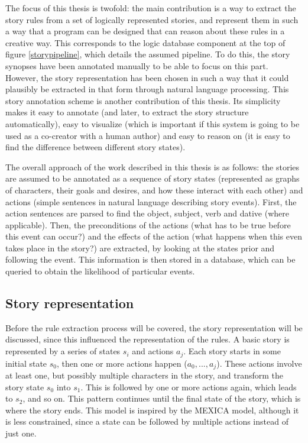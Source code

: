 The focus of this thesis is twofold: the main contribution is a way to extract
the story rules from a set of logically represented stories, and represent them 
in such a way that a program can be designed that can reason about these rules in a creative way. 
This corresponds to the logic database component at the top
of figure \ref{storypipeline}, which details the assumed pipeline. To do this, the story synopses have been
annotated manually to be able to focus on this part. However, the story
representation has been chosen in such a way that it could plausibly be extracted
in that form through natural language processing. 
This story annotation scheme is another contribution of this thesis. Its
simplicity makes it easy to annotate (and later, to extract the story structure automatically),
easy to visualize (which is important if this system is going to be used as a
co-creator with a human author) and easy to reason on (it is easy to find the
difference between different story states).

The overall approach of the work described in this thesis is as follows: the
stories are assumed to be annotated as a sequence of story states (represented
as graphs of characters, their goals and desires, and how these interact with
each other) and actions (simple sentences in natural language describing story
events). First, the action sentences are parsed to find the object, subject,
verb and dative (where applicable). Then, the preconditions of the actions (what
has to be true before this event can occur?) and the effects of the action (what
happens when this even takes place in the story?) are extracted, by looking at
the states prior and following the event. This information is then stored in a
database, which can be queried to obtain the likelihood of particular events.

\subsection{Story representation}

Before the rule extraction process will be covered, the story representation
will be discussed, since this influenced the representation of the rules.
A basic story is represented by a series of states $s_i$ and actions $a_j$.
Each story starts in some initial state $s_0$, then one or more actions happen
($a_0, ..., a_j$). These actions involve at least one, but
possibly multiple characters in the story, and transform the story state $s_0$
into $s_1$. This is followed by one or more actions
again, which leads to $s_2$, and so on. This pattern continues until the final 
state of the story, which is where the story ends. This model is inspired by the
MEXICA model, although it is less constrained, since a state can be followed by
multiple actions instead of just one.

